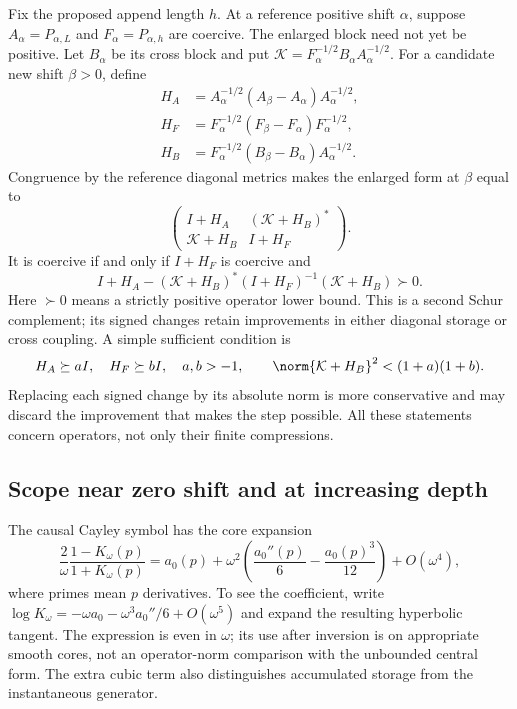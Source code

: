 Fix the proposed append length $h$. At a reference positive shift
$\alpha$, suppose $A_\alpha=P_{\alpha,L}$ and
$F_\alpha=P_{\alpha,h}$ are coercive. The enlarged block need
not yet be positive. Let $B_\alpha$ be its cross block and put
$\mathcal K=F_\alpha^{-1/2}B_\alpha A_\alpha^{-1/2}$.
For a candidate new shift $\beta>0$, define
\begin{align}
 H_A&=A_\alpha^{-1/2}(A_\beta-A_\alpha)A_\alpha^{-1/2},\\
 H_F&=F_\alpha^{-1/2}(F_\beta-F_\alpha)F_\alpha^{-1/2},\\
 H_B&=F_\alpha^{-1/2}(B_\beta-B_\alpha)A_\alpha^{-1/2}.
\end{align}
Congruence by the reference diagonal metrics makes the enlarged
form at $\beta$ equal to
\[
 \begin{pmatrix}
 I+H_A&(\mathcal K+H_B)^*\\
 \mathcal K+H_B&I+H_F
 \end{pmatrix}.
\]
It is coercive if and only if $I+H_F$ is coercive and
\begin{equation}\label{eq:si-joint}
 \boxed{I+H_A-(\mathcal K+H_B)^*(I+H_F)^{-1}
                     (\mathcal K+H_B)\succ0.}
\end{equation}
Here $\succ0$ means a strictly positive operator lower bound.
This is a second Schur complement; its signed changes retain
improvements in either diagonal storage or cross coupling.
A simple sufficient condition is
\[
 H_A\succeq aI,\quad H_F\succeq bI,\quad a,b>-1,\qquad
 \norm{\mathcal K+H_B}^2<(1+a)(1+b).
\]
Replacing each signed change by its absolute norm is more
conservative and may discard the improvement that makes the step
possible. All these statements concern operators, not only their
finite compressions.

\subsection{Scope near zero shift and at increasing depth}

The causal Cayley symbol has the core expansion
\begin{equation}
 \frac2\omega\frac{1-K_\omega(p)}{1+K_\omega(p)}
 =a_0(p)+\omega^2\left(\frac{a_0''(p)}6
                         -\frac{a_0(p)^3}{12}\right)+O(\omega^4),
\end{equation}
where primes mean $p$ derivatives. To see the coefficient, write
$\log K_\omega=-\omega a_0-\omega^3a_0''/6+O(\omega^5)$
and expand the resulting hyperbolic tangent. The expression is
even in $\omega$; its use after inversion is on appropriate smooth
cores, not an operator-norm comparison with the unbounded central
form. The extra cubic term also distinguishes accumulated storage
from the instantaneous generator.

